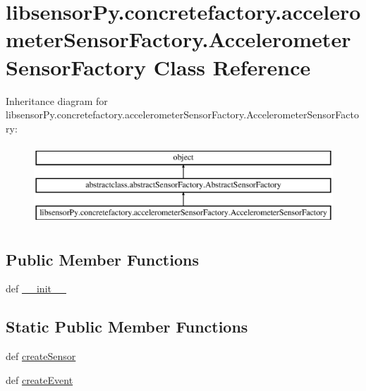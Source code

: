 \hypertarget{classlibsensorPy_1_1concretefactory_1_1accelerometerSensorFactory_1_1AccelerometerSensorFactory}{}\section{libsensor\+Py.\+concretefactory.\+accelerometer\+Sensor\+Factory.\+Accelerometer\+Sensor\+Factory Class Reference}
\label{classlibsensorPy_1_1concretefactory_1_1accelerometerSensorFactory_1_1AccelerometerSensorFactory}
Inheritance diagram for libsensor\+Py.\+concretefactory.\+accelerometer\+Sensor\+Factory.\+Accelerometer\+Sensor\+Factory\+:\begin{figure}[H]
\begin{center}
\leavevmode
\includegraphics[height=3.000000cm]{classlibsensorPy_1_1concretefactory_1_1accelerometerSensorFactory_1_1AccelerometerSensorFactory}
\end{center}
\end{figure}
\subsection*{Public Member Functions}
\begin{DoxyCompactItemize}
\item 
def \hyperlink{classlibsensorPy_1_1concretefactory_1_1accelerometerSensorFactory_1_1AccelerometerSensorFactory_ad691f08b86a375e9f658caa907b71cb8}{\+\_\+\+\_\+init\+\_\+\+\_\+}
\end{DoxyCompactItemize}
\subsection*{Static Public Member Functions}
\begin{DoxyCompactItemize}
\item 
def \hyperlink{classlibsensorPy_1_1concretefactory_1_1accelerometerSensorFactory_1_1AccelerometerSensorFactory_a6040b2456800f93e521c1ba4865904bc}{create\+Sensor}
\item 
def \hyperlink{classlibsensorPy_1_1concretefactory_1_1accelerometerSensorFactory_1_1AccelerometerSensorFactory_a5e15ff219e40d5a4fcbc343641c4b19c}{create\+Event}
\end{DoxyCompactItemize}


